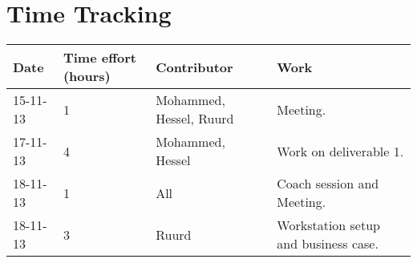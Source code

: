 
\appendix
	\renewcommand{\thepage}{\thechapter-\arabic{page}}



\chapter{Time Tracking}

\begin{center}
    \begin{tabular}{| l | l | l | l |}
    \hline
    
    Date & Time effort (hours) & Contributor & Work\\ \hline \hline
    15-11-13 & 1  & Mohammed, Hessel, Ruurd & Meeting.\\ \hline
    17-11-13 & 4  & Mohammed, Hessel & Work on deliverable 1.\\ \hline
    18-11-13 & 1  & All & Coach session and Meeting.\\ \hline
    18-11-13 & 3  & Ruurd & Workstation setup and business case.\\ \hline
    
    \hline
    \end{tabular}
\end{center}







\clearpage
